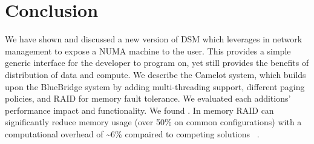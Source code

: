 \section{Conclusion}
\label{sec:conclusion}

We have shown and discussed a new version of DSM which leverages in network
management to expose a NUMA machine to the user. This provides a simple
generic interface for the developer to program on, yet still provides the
benefits of distribution of data and compute. We describe the Camelot system,
which builds upon the BlueBridge system by adding multi-threading support,
different paging policies, and RAID for memory fault tolerance. We evaluated
each additions' performance impact and functionality. We found . In memory RAID can significantly reduce
memory usage (over 50\% on common configurations) with a computational overhead
of \textasciitilde6\% compaired to competing solutions~
\cite{Ousterhout:2015:RSS:2818727.2806887}.